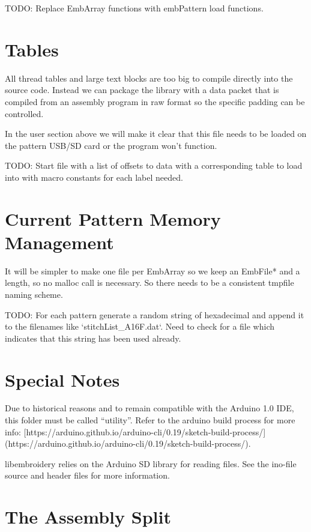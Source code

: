 \documentclass{report}
\begin{document}
TODO: Replace EmbArray functions with embPattern load functions.

\section{Tables}

All thread tables and large text blocks are too big to compile directly
into the source code. Instead we can package the library with a data packet
that is compiled from an assembly program in raw format so the specific
padding can be controlled.

In the user section above we will make it clear that this file
needs to be loaded on the pattern USB/SD card or the program won't function.

TODO: Start file with a list of offsets to data with a corresponding table
to load into with macro constants for each label needed.

\section{Current Pattern Memory Management}

It will be simpler to make one file per EmbArray so we keep an EmbFile*
and a length, so no malloc call is necessary. So there needs to be a consistent
tmpfile naming scheme.

TODO: For each pattern generate a random string of hexadecimal and append it
to the filenames like `stitchList\_A16F.dat`. Need to check for a file
which indicates that this string has been used already.

\section{Special Notes}

Due to historical reasons and to remain compatible with the Arduino 1.0
IDE, this folder must be called ``utility''. Refer to the arduino build
process for more info:
[https://arduino.github.io/arduino-cli/0.19/sketch-build-process/](https://arduino.github.io/arduino-cli/0.19/sketch-build-process/).

libembroidery relies on the Arduino SD library for reading files. See
the ino-file source and header files for more information.

\section{The Assembly Split}
\end{document}

